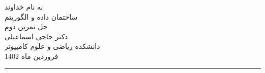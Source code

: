 \begin{minipage}{0.1\textwidth}

\end{minipage}%
\hfill%
\begin{minipage}{0.6\textwidth}\centering
\fontsize{10pt}{10pt}\selectfont
به نام خداوند \\
ساختمان داده و الگوریتم \\
حل تمرین دوم\\
دکتر حاجی اسماعیلی \\
\vspace{0.25cm}
\begingroup
\fontsize{8pt}{8pt}\selectfont
دانشکده ریاضی و علوم کامپیوتر \\
فروردین ماه 1402 \\
\endgroup
\end{minipage}%
\hfill%
\begin{minipage}{0.1\textwidth}
\end{minipage}

\vspace{0.5cm}

\noindent\rule{\textwidth}{1pt}
